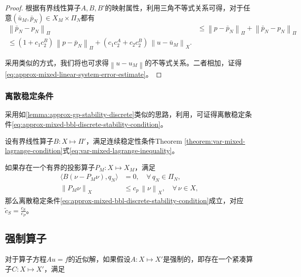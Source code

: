 \begin{proof}
  根据有界线性算子$A,B,B'$的映射属性，利用三角不等式关系可得，对于任意$\left( \bar{u}_{M}, \bar{p}_{N} \right) \in X_{M} \times \Pi_{N}$都有
  \begin{equation*}
    \begin{split}
      \left\| \bar{p}_{N} - p_{N} \right\|_{\Pi}
      & \le \left\| p - \bar{p}_{N} \right\|_{\Pi} +
      \left\| \bar{p}_{N} - p_{N} \right\|_{\Pi} \\
      \le \left( 1 + c_{1} c_{2}^{B} \right) \,
      \left\| p - \bar{p}_{N} \right\|_{\Pi} +
      \left( c_{1} c_{2}^{A} + c_{2} c_{2}^{B} \right) \,
      \left\| u - \bar{u}_{M} \right\|_{X}.
    \end{split}
  \end{equation*}

  采用类似的方式，我们将也可求得$\left\| u - u_{M} \right\|$的不等式关系。二者相加，证得\eqref{eq:approx-mixed-linear-system-error-estimate}。
\end{proof}

\subsubsection{离散稳定条件}
\label{sec:approx-mixed-bbl-prove}

采用如\eqref{lemma:approx-gp-stability-discrete}类似的思路，利用\cite{Fortin:1977vh}，可证得离散稳定条件\eqref{eq:approx-mixed-bbl-discrete-stability-condition}。

\begin{lemma}[离散稳定条件的证明]
\label{lemma:approx-mixed-bbl-prove}
设有界线性算子$B: X \mapsto \Pi'$，满足连续稳定性条件Theorem \ref{theorem:var-mixed-lagrange-condition}式\ref{eq:var-mixed-lagrange-inequality}。

如果存在一个有界的投影算子$P_{M}: X \mapsto X_{M}$，满足
\begin{equation*}
  \begin{split}
    \langle B \left( \nu - P_{M} \nu \right) , q_{N} \rangle & = 0, \quad \forall \, q_{N} \in \Pi_{N}, \\
    \left\| P_{M} \nu \right\|_{X} & \le c_{p} \, \left\| \nu \right\|_{X}, \quad \forall \, \nu \in X,
  \end{split}
\end{equation*}
那么离散稳定条件\eqref{eq:approx-mixed-bbl-discrete-stability-condition}成立，对应$\tilde{c}_{S} = \frac{c_{S}}{c_{P}}$。
\end{lemma}

\subsection{强制算子}
\label{sec:approx-coercive}

对于算子方程$A u = f$的近似解，如果假设$A:X \mapsto X'$是强制的，即存在一个紧凑算子$C:X \mapsto X'$，满足
